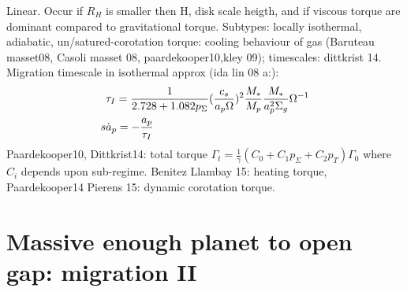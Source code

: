 \begin{workout}
\begin{workout}
Linear. Occur if $R_H$ is smaller then H, disk scale heigth, and if viscous torque are dominant compared to gravitational torque.
Subtypes: locally isothermal, adiabatic, un/satured-corotation torque: cooling behaviour of gas (Baruteau masset08, Casoli masset 08, paardekooper10,kley 09); timescales: dittkrist 14.
Migration timescale in isothermal approx (ida lin 08 a:):
\begin{align*}
&\tau_I=\frac{1}{2.728+1.082p_{\Sigma}}(\frac{c_s}{a_p\Omega})^2\frac{M_*}{M_p}\frac{M_*}{a_p^2\Sigma_g}\Omega^{-1}\\
s&\dot{a}_p=-\frac{a_p}{\tau_I}
\end{align*}
Paardekooper10, Dittkrist14: total torque $\Gamma_t=\frac{1}{\gamma}(C_0+C_1p_{\Sigma}+C_2p_T)\Gamma_0$ where $C_i$ depends upon sub-regime.
Benitez Llambay 15: heating torque, Paardekooper14 Pierens 15: dynamic corotation torque.
\end{workout}

\section{Massive enough planet to open gap: migration II}



\end{workout}

